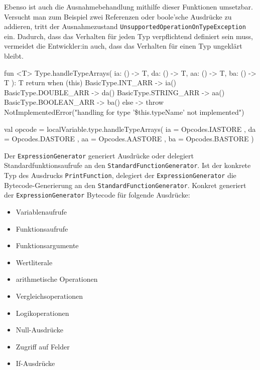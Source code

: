 Ebenso ist auch die Ausnahmebehandlung mithilfe dieser Funktionen umsetzbar. Versucht man zum Beispiel zwei Referenzen oder boole'sche Ausdrücke zu addieren, tritt der Ausnahmezustand \texttt{UnsupportedOperationOnTypeException} ein. Dadurch, dass das Verhalten für jeden Typ verpflichtend definiert sein muss, vermeidet die Entwickler:in auch, dass das Verhalten für einen Typ ungeklärt bleibt.

\begin{KotlinCode}[numbers=none, caption={Die Erweiterungsfunktion \texttt{Type.handleTypeArrays}, um den richtigen Opcode zum Speichern einer Variable zu ermitteln.}, label=lst:impl_handletypearrays]
fun <T> Type.handleTypeArrays(
    ia: () -> T,
    da: () -> T,
    aa: () -> T,
    ba: () -> T
): T {
    return when (this) {
        BasicType.INT_ARR -> ia()
        BasicType.DOUBLE_ARR -> da()
        BasicType.STRING_ARR -> aa()
        BasicType.BOOLEAN_ARR -> ba()
        else -> throw NotImplementedError("handling for type '\${this.typeName}' not implemented")
    }
}

val opcode = localVariable.type.handleTypeArrays(
    ia = { Opcodes.IASTORE },
    da = { Opcodes.DASTORE },
    aa = { Opcodes.AASTORE },
    ba = { Opcodes.BASTORE }
)
\end{KotlinCode}

Der \texttt{ExpressionGenerator} generiert Ausdrücke oder delegiert Standardfunktionsaufrufe an den \texttt{StandardFunctionGenerator}. Ist der konkrete Typ des Ausdrucks \texttt{PrintFunction}, delegiert der \texttt{ExpressionGenerator} die Bytecode-Generierung an den \texttt{StandardFunctionGenerator}. Konkret generiert der \texttt{ExpressionGenerator} Bytecode für folgende Ausdrücke:

\begin{itemize}
    \item Variablenaufrufe
    \item Funktionsaufrufe
    \item Funktionsargumente
    \item Wertliterale
    \item arithmetische Operationen
    \item Vergleichsoperationen
    \item Logikoperationen
    \item Null-Ausdrücke
    \item Zugriff auf Felder
    \item If-Ausdrücke
\end{itemize}

